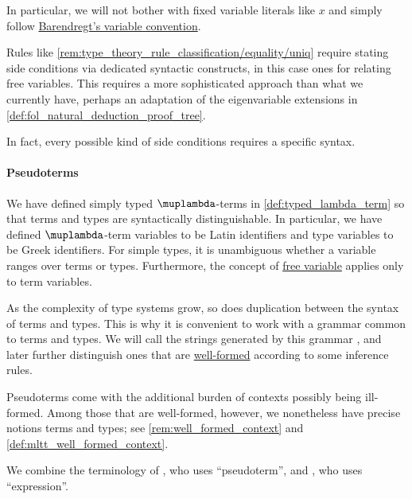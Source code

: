 \begin{remark}
\begin{thmenum}
    In particular, we will not bother with fixed variable literals like \( x \) and simply follow \hyperref[rem:barendregt_variable_convention]{Barendregt's variable convention}.

     Rules like \cref{rem:type_theory_rule_classification/equality/uniq} require stating side conditions via dedicated syntactic constructs, in this case ones for relating free variables. This requires a more sophisticated approach than what we currently have, perhaps an adaptation of the eigenvariable extensions in \cref{def:fol_natural_deduction_proof_tree}.

    In fact, every possible kind of side conditions requires a specific syntax.
  \end{thmenum}
\end{remark}

\paragraph{Pseudoterms}

\begin{concept}\label{con:pseudoterm_expression}\mimprovised
  We have defined simply typed \( \muplambda \)-terms in \cref{def:typed_lambda_term} so that terms and types are syntactically distinguishable. In particular, we have defined \( \muplambda \)-term variables to be Latin identifiers and type variables to be Greek identifiers. For simple types, it is unambiguous whether a variable ranges over terms or types. Furthermore, the concept of \hyperref[con:variable_binding]{free variable} applies only to term variables.

  As the complexity of type systems grow, so does duplication between the syntax of terms and types. This is why it is convenient to work with a grammar common to terms and types. We will call the strings generated by this grammar , and later further distinguish ones that are \hyperref[rem:well_formed_context]{well-formed} according to some inference rules.
\end{concept}
\begin{comments}
  \item Pseudoterms come with the additional burden of contexts possibly being ill-formed. Among those that are well-formed, however, we nonetheless have precise notions terms and types; see \cref{rem:well_formed_context} and \cref{def:mltt_well_formed_context}.

  \item We combine the terminology of \textcite[\S 5.2]{Barendregt1992LambdaCalculiWithTypes}, who uses \enquote{pseudoterm}, and \textcite[\S 8.1.1]{Mimram2020ProgramEqualsProof}, who uses \enquote{expression}.
\end{comments}

